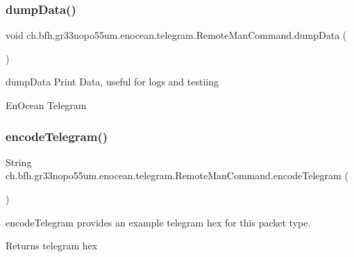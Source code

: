 \subsubsection{\texorpdfstring{dump\+Data()}{dumpData()}}
{\footnotesize\ttfamily void ch.\+bfh.\+gr33nopo55um.\+enocean.\+telegram.\+Remote\+Man\+Command.\+dump\+Data (\begin{DoxyParamCaption}{ }\end{DoxyParamCaption})}

dump\+Data Print Data, useful for logs and testiing 

En\+Ocean Telegram \hypertarget{classch_1_1bfh_1_1gr33nopo55um_1_1enocean_1_1telegram_1_1_remote_man_command_aee8b38ab2203e839c8887386739a4f6b}{}\label{classch_1_1bfh_1_1gr33nopo55um_1_1enocean_1_1telegram_1_1_remote_man_command_aee8b38ab2203e839c8887386739a4f6b} 
\subsubsection{\texorpdfstring{encode\+Telegram()}{encodeTelegram()}}
{\footnotesize\ttfamily String ch.\+bfh.\+gr33nopo55um.\+enocean.\+telegram.\+Remote\+Man\+Command.\+encode\+Telegram (\begin{DoxyParamCaption}{ }\end{DoxyParamCaption})}

encode\+Telegram provides an example telegram hex for this packet type.

\begin{DoxyReturn}{Returns}
telegram hex 
\end{DoxyReturn}
\hypertarget{classch_1_1bfh_1_1gr33nopo55um_1_1enocean_1_1telegram_1_1_remote_man_command_adeb42a288935b022f0af305fb53a2d9a}{}\label{classch_1_1bfh_1_1gr33nopo55um_1_1enocean_1_1telegram_1_1_remote_man_command_adeb42a288935b022f0af305fb53a2d9a} 
